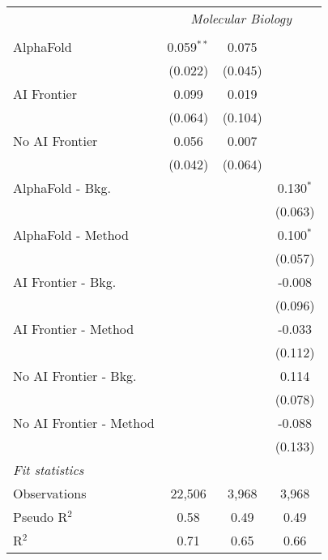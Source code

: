 \begin{tabular}{lccc}
 & \multicolumn{3}{c}{\textit{Molecular Biology}} \\ \\
   AlphaFold               & 0.059$^{**}$ & 0.075   &   \\   
                           & (0.022)      & (0.045) &   \\   
   AI Frontier             & 0.099        & 0.019   &   \\   
                           & (0.064)      & (0.104) &   \\   
   No AI Frontier          & 0.056        & 0.007   &   \\   
                           & (0.042)      & (0.064) &   \\   
   AlphaFold - Bkg.        &              &         & 0.130$^{*}$\\   
                           &              &         & (0.063)\\   
   AlphaFold - Method      &              &         & 0.100$^{*}$\\   
                           &              &         & (0.057)\\   
   AI Frontier - Bkg.      &              &         & -0.008\\   
                           &              &         & (0.096)\\   
   AI Frontier - Method    &              &         & -0.033\\   
                           &              &         & (0.112)\\   
   No AI Frontier - Bkg.   &              &         & 0.114\\   
                           &              &         & (0.078)\\   
   No AI Frontier - Method &              &         & -0.088\\   
                           &              &         & (0.133)\\   
   \midrule
   \emph{Fit statistics}\\
   Observations            & 22,506       & 3,968   & 3,968\\  
   Pseudo R$^2$            & 0.58         & 0.49    & 0.49\\  
   R$^2$                   & 0.71         & 0.65    & 0.66\\  
   

\end{tabular}
